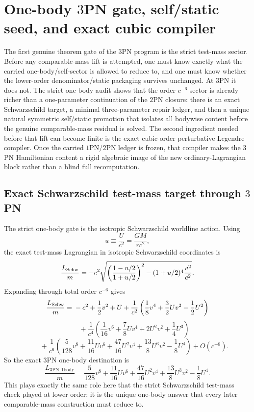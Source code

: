 \documentclass[11pt]{article}
\begin{document}

\section{One-body \texorpdfstring{$3$}{3}PN gate, self/static seed, and exact cubic compiler}
\label{sec:onebody}

The first genuine theorem gate of the $3$PN program is the strict test-mass
sector.  Before any comparable-mass lift is attempted, one must know exactly
what the carried one-body/self-sector is allowed to reduce to, and one must know
whether the lower-order denominator/static packaging survives unchanged.  At
$3$PN it does not.  The strict one-body audit shows that the order-$c^{-6}$
sector is already richer than a one-parameter continuation of the $2$PN closure:
there is an exact Schwarzschild target, a minimal three-parameter repair ledger,
and then a unique natural symmetric self/static promotion that isolates all
bodywise content before the genuine comparable-mass residual is solved.  The
second ingredient needed before that lift can become finite is the exact
cubic-order perturbative Legendre compiler.  Once the carried $1$PN/$2$PN
ledger is frozen, that compiler makes the $3$PN Hamiltonian content a rigid
algebraic image of the new ordinary-Lagrangian block rather than a blind full
recomputation.

\subsection{Exact Schwarzschild test-mass target through \texorpdfstring{$3$}{3}PN}
\label{sec:onebody-target}

The strict one-body gate is the isotropic Schwarzschild worldline action.  Using
\[
u\equiv \frac{U}{c^2}=\frac{GM}{rc^2},
\]
the exact test-mass Lagrangian in isotropic Schwarzschild coordinates is
\[
\frac{L_{\rm Schw}}{m}
=
-c^2\sqrt{\left(\frac{1-u/2}{1+u/2}\right)^2-(1+u/2)^4\frac{v^2}{c^2}}.
\]
Expanding through total order $c^{-6}$ gives
\[
\frac{L_{\rm Schw}}{m}
={}-c^2+\frac12v^2+U
+\frac{1}{c^2}\left(\frac18v^4+\frac32Uv^2-\frac12U^2\right)
\]
\[
\qquad
+\frac{1}{c^4}\left(\frac1{16}v^6+\frac78Uv^4+2U^2v^2+\frac14U^3\right)
\]
\[
\qquad
+\frac{1}{c^6}\left(
\frac5{128}v^8
+\frac{11}{16}Uv^6
+\frac{47}{16}U^2v^4
+\frac{13}{8}U^3v^2
-\frac18U^4
\right)
+O(c^{-8}).
\]
So the exact $3$PN one-body destination is
\[
\boxed{
\frac{L_{3\mathrm{PN},1\mathrm{body}}}{m}
=
\frac5{128}v^8
+\frac{11}{16}Uv^6
+\frac{47}{16}U^2v^4
+\frac{13}{8}U^3v^2
-\frac18U^4.
}
\]
This plays exactly the same role here that the strict Schwarzschild test-mass
check played at lower order: it is the unique one-body answer that every later
comparable-mass construction must reduce to.
\end{document}
